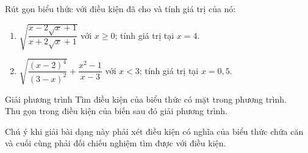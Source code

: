 \begin{vd}
	Rút gọn biểu thức với điều kiện đã cho và tính giá trị của nó:
	\begin{enumerate}
		\item $ \sqrt{\dfrac{x-2\sqrt{x}+1}{x+2\sqrt{x}+1}} $ với $ x\ge0 $; tính giá trị tại $ x = 4 $.
		\item $ \sqrt{\dfrac{(x-2)^4}{(3-x)^2}} + \dfrac{x^2-1}{x-3} $ với $  x<3 $;  tính giá trị tại $ x = 0{,}5 $.
	\end{enumerate}
\end{vd}

\begin{dang}{Giải phương trình}
    Tìm điều kiện của biểu thức có mặt trong phương trình.\\
    Thu gọn trong điều kiện của biến sau đó giải phương trình.
    \begin{note}
    	Chú ý khi giải bài dạng này phải xét điều kiện có nghĩa của biểu thức chứa căn và cuối cùng phải đối chiếu nghiệm tìm được với điều kiện.
    \end{note}
\end{dang}

